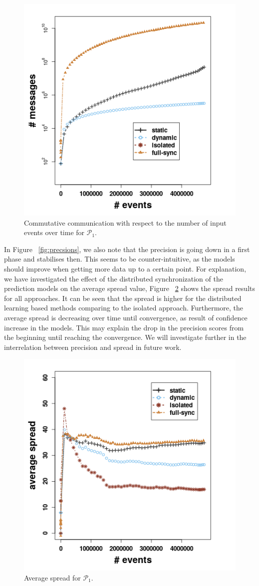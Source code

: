 \begin{center}
	
	\begin{figure}[h]
		
		\includegraphics[width=.5\textwidth]{figures/messages_p1.png}
		
		\caption{Commutative communication with respect to the number of input events over time for $\mathcal{P}_1$.}
		\label{fig:comm}
	\end{figure}
\end{center}


In Figure ~\ref{fig:precsions}, we also note that the precision is going down in a first phase and stabilises then.  This seems to be counter-intuitive, as the models should improve when getting more data up to a certain point. For explanation, we have investigated the effect of the distributed synchronization of the prediction models on the average spread value, Figure  ~\ref{fig:spread}  shows the spread results for all approaches. It can be seen that the spread is higher for the distributed learning based methods comparing to the isolated approach. Furthermore, the average spread is decreasing over time until convergence, as result of confidence increase in the models. This may explain the drop in the precision scores from the beginning until reaching the convergence. We will investigate further in the interrelation between precision and spread in future work. 

\begin{center}
	
	\begin{figure}[h]
		
		\includegraphics[width=.5\textwidth]{figures/spread_p1.png}
		
		\caption{Average spread for $\mathcal{P}_1$.}
		\label{fig:spread}
	\end{figure}
\end{center}




